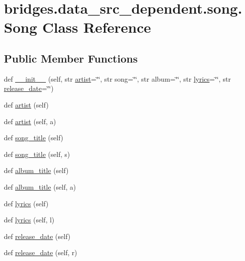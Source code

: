 \hypertarget{classbridges_1_1data__src__dependent_1_1song_1_1_song}{}\section{bridges.\+data\+\_\+src\+\_\+dependent.\+song.\+Song Class Reference}
\label{classbridges_1_1data__src__dependent_1_1song_1_1_song}
\subsection*{Public Member Functions}
\begin{DoxyCompactItemize}
\item 
def \mbox{\hyperlink{classbridges_1_1data__src__dependent_1_1song_1_1_song_a8afad65f77f1752a32fb462c6456aa67}{\+\_\+\+\_\+init\+\_\+\+\_\+}} (self, str \mbox{\hyperlink{classbridges_1_1data__src__dependent_1_1song_1_1_song_a82ffeb5ab815a4e5028f113e8eb2a482}{artist}}=\char`\"{}\char`\"{}, str song=\char`\"{}\char`\"{}, str album=\char`\"{}\char`\"{}, str \mbox{\hyperlink{classbridges_1_1data__src__dependent_1_1song_1_1_song_a9f7ec8dec6e40fbac228631b23e1734c}{lyrics}}=\char`\"{}\char`\"{}, str \mbox{\hyperlink{classbridges_1_1data__src__dependent_1_1song_1_1_song_af69707705b6d4fbba2884ca3a21343a4}{release\+\_\+date}}=\char`\"{}\char`\"{})
\item 
def \mbox{\hyperlink{classbridges_1_1data__src__dependent_1_1song_1_1_song_a82ffeb5ab815a4e5028f113e8eb2a482}{artist}} (self)
\item 
def \mbox{\hyperlink{classbridges_1_1data__src__dependent_1_1song_1_1_song_a918ecca7107f6af77f5b15d2bee5ea98}{artist}} (self, a)
\item 
def \mbox{\hyperlink{classbridges_1_1data__src__dependent_1_1song_1_1_song_a1c34d8af79451417060ee5d1e860e31e}{song\+\_\+title}} (self)
\item 
def \mbox{\hyperlink{classbridges_1_1data__src__dependent_1_1song_1_1_song_aa1f51734629030528f5bc86a6b2478f1}{song\+\_\+title}} (self, s)
\item 
def \mbox{\hyperlink{classbridges_1_1data__src__dependent_1_1song_1_1_song_a5ecb8e966ffd3659875ed3b751ed294c}{album\+\_\+title}} (self)
\item 
def \mbox{\hyperlink{classbridges_1_1data__src__dependent_1_1song_1_1_song_a62f0c444ecc16f3d87cfd0b3e0d60b52}{album\+\_\+title}} (self, a)
\item 
def \mbox{\hyperlink{classbridges_1_1data__src__dependent_1_1song_1_1_song_a9f7ec8dec6e40fbac228631b23e1734c}{lyrics}} (self)
\item 
def \mbox{\hyperlink{classbridges_1_1data__src__dependent_1_1song_1_1_song_ab88a7122f8d962728e25fa0152dd8542}{lyrics}} (self, l)
\item 
def \mbox{\hyperlink{classbridges_1_1data__src__dependent_1_1song_1_1_song_af69707705b6d4fbba2884ca3a21343a4}{release\+\_\+date}} (self)
\item 
def \mbox{\hyperlink{classbridges_1_1data__src__dependent_1_1song_1_1_song_a213d73d84e0703204841567dcc2723f3}{release\+\_\+date}} (self, r)
\end{DoxyCompactItemize}


